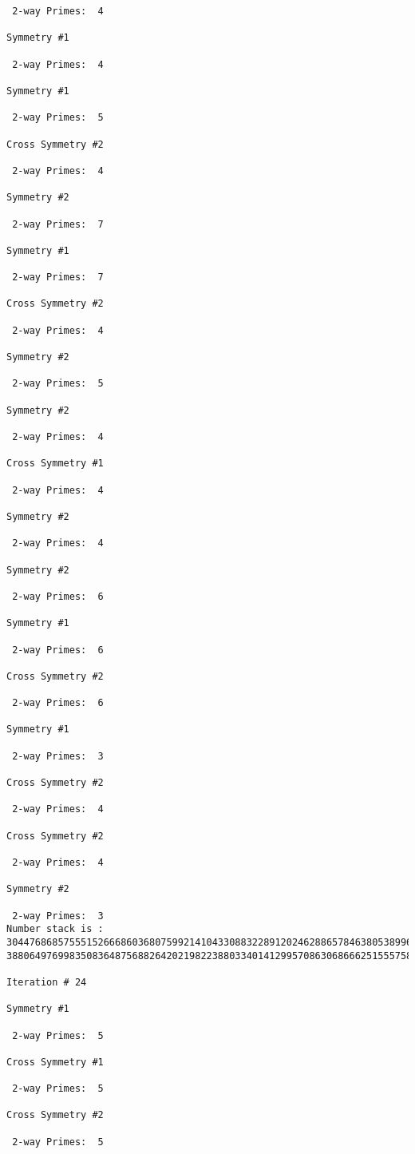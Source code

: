 {{{{\begin{verbatim}
 2-way Primes: 	4

Symmetry #1

 2-way Primes: 	4

Symmetry #1

 2-way Primes: 	5

Cross Symmetry #2

 2-way Primes: 	4

Symmetry #2

 2-way Primes: 	7

Symmetry #1

 2-way Primes: 	7

Cross Symmetry #2

 2-way Primes: 	4

Symmetry #2

 2-way Primes: 	5

Symmetry #2

 2-way Primes: 	4

Cross Symmetry #1

 2-way Primes: 	4

Symmetry #2

 2-way Primes: 	4

Symmetry #2

 2-way Primes: 	6

Symmetry #1

 2-way Primes: 	6

Cross Symmetry #2

 2-way Primes: 	6

Symmetry #1

 2-way Primes: 	3

Cross Symmetry #2

 2-way Primes: 	4

Cross Symmetry #2

 2-way Primes: 	4

Symmetry #2

 2-way Primes: 	3
Number stack is :
30447686857555152666860368075992141043308832289120246288657846380538996794608835958544046240163340857
38806497699835083648756882642021982238803340141299570863068666251555758686744037580433610426404458595

Iteration #	24

Symmetry #1

 2-way Primes: 	5

Cross Symmetry #1

 2-way Primes: 	5

Cross Symmetry #2

 2-way Primes: 	5


\end{verbatim}}}}}
